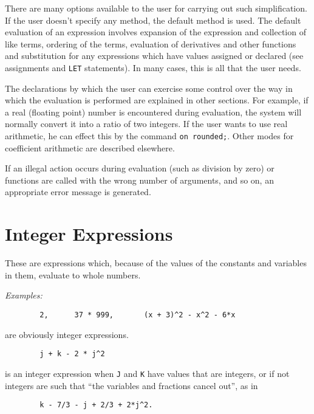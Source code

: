 There are many options available to the user for carrying out such
simplification.  If the user doesn't specify any
method, the default method is used.  The default evaluation of an
expression involves expansion of the expression and collection of like
terms, ordering of the terms, evaluation of derivatives and other
functions and substitution for any expressions which have values assigned
or declared (see assignments and \texttt{LET} statements).  In many cases,
this is all that the user needs.

The declarations by which the user can exercise some control over the way
in which the evaluation is performed are explained in other sections.  For
example, if a real (floating point) number is encountered during
evaluation, the system will normally convert it into a ratio of two
integers.  If the user wants to use real arithmetic, he can effect this by
the command \texttt{on rounded;}. Other modes for
coefficient arithmetic are described elsewhere.

If an illegal action occurs during evaluation (such as division by zero)
or functions are called with the wrong number of arguments, and so on, an
appropriate error message is generated.

\section{Integer Expressions}

These are expressions which, because of the values of the
constants and variables in them, evaluate to whole numbers.

\textit{Examples:}
\begin{verbatim}
        2,      37 * 999,       (x + 3)^2 - x^2 - 6*x
\end{verbatim}
are obviously integer expressions.
\begin{verbatim}
        j + k - 2 * j^2
\end{verbatim}
is an integer expression when \texttt{J} and \texttt{K} have values that are
integers, or if not integers are such that ``the variables and fractions
cancel out'', as in
\begin{verbatim}
        k - 7/3 - j + 2/3 + 2*j^2.
\end{verbatim}

